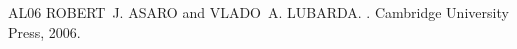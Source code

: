 \documentclass[letterpaper,10pt,english]{sphinxmanual}
\begin{document}
\sphinxAtStartPar


\begin{sphinxthebibliography}{AL06}
\sphinxAtStartPar
ROBERT J. ASARO and VLADO A. LUBARDA. . Cambridge University Press, 2006.
\end{sphinxthebibliography}



\renewcommand{\indexname}{Index}
\printindex
\end{document}
